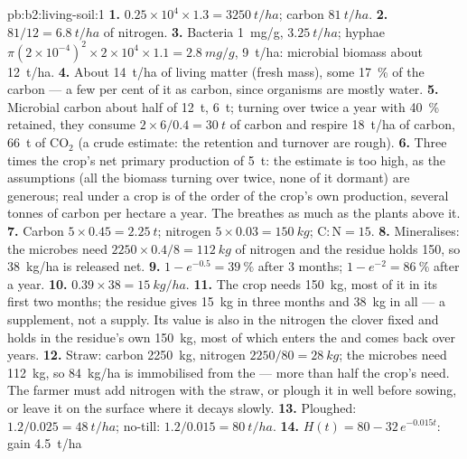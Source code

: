 \begin{solution}{pb:b2:living-soil:1}
\textbf{1.} $0.25\times 10^{4}\times 1.3 = \qty{3250}{t/ha}$;
carbon $\qty{81}{t/ha}$.
\textbf{2.} $81/12 = \qty{6.8}{t/ha}$ of nitrogen.
\textbf{3.} Bacteria \qty{1}{mg/g}, $\qty{3.25}{t/ha}$; hyphae
$\pi(2\times 10^{-4})^{2}\times 2\times 10^{4}\times 1.1 =
\qty{2.8}{mg/g}$, \qty{9}{t/ha}: microbial biomass about
\qty{12}{t/ha}.
\textbf{4.} About \qty{14}{t/ha} of living matter (fresh mass),
some \qty{17}{\%} of the  carbon --- a few per cent of it as
carbon, since organisms are mostly water.
\textbf{5.} Microbial carbon about half of \qty{12}{t}, \qty{6}{t};
turning over twice a year with \qty{40}{\%} retained, they consume
$2\times 6/0.4 = \qty{30}{t}$ of carbon and respire \qty{18}{t/ha}
of carbon, \qty{66}{t} of $\mathrm{CO_2}$ (a crude estimate: the
retention and turnover are rough).
\textbf{6.} Three times the crop's net primary production of
\qty{5}{t}: the estimate is too high, as the assumptions (all the
biomass turning over twice, none of it dormant) are generous;
real  under a crop is of the order of the crop's
own production, several tonnes of carbon per hectare a year. The
 breathes as much as the plants above it.
\textbf{7.} Carbon $5\times 0.45 = \qty{2.25}{t}$; nitrogen $5\times
0.03 = \qty{150}{kg}$; $\mathrm{C:N} = 15$.
\textbf{8.} Mineralises: the microbes need $2250\times 0.4/8 =
\qty{112}{kg}$ of nitrogen and the residue holds 150, so
\qty{38}{kg/ha} is released net.
\textbf{9.} $1 - e^{-0.5} = \qty{39}{\%}$ after 3 months; $1 - e^{-2}
= \qty{86}{\%}$ after a year.
\textbf{10.} $0.39\times 38 = \qty{15}{kg/ha}$.
\textbf{11.} The crop needs \qty{150}{kg}, most of it in its first
two months; the residue gives \qty{15}{kg} in three months and
\qty{38}{kg} in all --- a supplement, not a supply. Its value is
also in the nitrogen the clover fixed and holds in the residue's
own \qty{150}{kg}, most of which enters the  and comes back
over years.
\textbf{12.} Straw: carbon \qty{2250}{kg}, nitrogen $2250/80 =
\qty{28}{kg}$; the microbes need \qty{112}{kg}, so \qty{84}{kg/ha}
is immobilised from the  --- more than half the crop's need.
The farmer must add nitrogen with the straw, or plough it in well
before sowing, or leave it on the surface where it decays slowly.
\textbf{13.} Ploughed: $1.2/0.025 = \qty{48}{t/ha}$; no-till:
$1.2/0.015 = \qty{80}{t/ha}$.
\textbf{14.} $H(t) = 80 - 32\,e^{-0.015t}$: gain \qty{4.5}{t/ha}

\end{solution}
